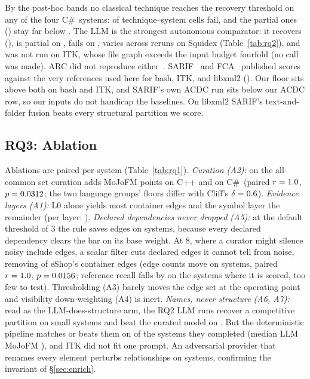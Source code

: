 By the post-hoc bands no classical technique reaches the recovery threshold on any of the four
C\#\ systems: \rqTwoCsClassicalFailed{} of \rqTwoCsClassicalCells{} technique--system cells fail,
and the \rqTwoCsClassicalPartial{} partial ones (\rqTwoCsClassicalPartialList{}) stay far below
\rqTwoRecoveredMin{}. The LLM is the strongest autonomous comparator: it recovers
\rqTwoLlmCsRecovered{} (\rqOneLlmEshopMoJo{}), is partial on \rqTwoLlmCsPartial{}, fails on
\rqTwoLlmCsFailed{}, varies across reruns on Squidex (Table~\ref{tab:rq2}), and was not run on
ITK, whose file graph exceeds the input budget fourfold (no call was made). ARC did not
reproduce either~\cite{link2019value}. SARIF~\cite{zhang2023sarif} and FCA~\cite{teymourian2022fca}
published scores against the very references used here for bash, ITK, and libxml2
(\trPublished{}). Our floor sits above both on bash and ITK, and SARIF's own ACDC run sits below
our ACDC row, so our inputs do not handicap the baselines. On libxml2 SARIF's text-and-folder
fusion beats every structural partition we score.

\subsection{RQ3: Ablation}
\label{sec:rq3}

Ablations are paired per system (Table~\ref{tab:rq1}). \emph{Curation (A2):} on the all-common
set curation adds \rqThreeCurationLiftCpp{} MoJoFM points on C++ and \rqThreeCurationLiftCs{} on
C\#\ (paired $r=1.0{}$, $p=0.0312{}$; the two
language groups' floors differ with Cliff's $\delta=0.6{}$).
\emph{Evidence layers (A1):} L0 alone yields
most container edges and the symbol layer the remainder (per layer: \trAblation{}).
\emph{Declared dependencies never dropped (A5):} at the default threshold of 3 the rule saves
\rqThreeAfiveOperatingEdgesSaved{} edges on \rqThreeAfiveOperatingSystemsChecked{} systems,
because every declared dependency clears the bar on its base weight. At 8, where a curator might
silence noisy include edges, a scalar filter cuts declared edges it cannot tell from noise,
removing \rqThreeAfiveEshopEdgesSaved{} of eShop's container edges (edge counts move on
\rqThreeAfiveWilcoxonN{} systems, paired $r=1.0{}$,
$p=0.0156{}$; reference recall falls by \rqThreeAfiveRefRecallDropList{} on the
\rqThreeAfiveRefRecallSystems{} systems where it is scored, too few to test). Thresholding (A3)
barely moves the edge set at the operating point and visibility down-weighting (A4) is inert.
\emph{Names, never structure (A6, A7):} read as the LLM-does-structure arm, the RQ2 LLM runs
recover a competitive partition on small systems and beat the curated model on
\rqThreeSixLlmGtPipelineList{}. But the deterministic pipeline matches or beats them on
\rqThreeSixPipelineGeLlm{} of the systems they completed (median LLM MoJoFM
\rqThreeSixLlmMedianMoJo{}), and ITK did not fit one prompt. An adversarial provider that renames every
element perturbs \rqThreeSevenMaxStructuralDelta{} relationships on
\rqThreeSevenSystemsChecked{} systems, confirming the invariant of \S\ref{sec:enrich}.


